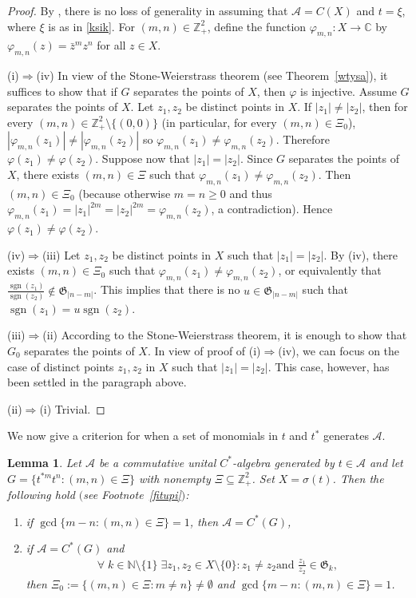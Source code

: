 \documentclass[reqno]{amsproc}
\DeclareMathOperator{\sgn}{sgn}
\numberwithin{equation}{section}
\newtheorem{lemma}[theorem]{Lemma}
\theoremstyle{remark}
\newcommand*{\ascr}{\mathscr{A}}
\newcommand*{\natu}{\mathbb{N}}
\newcommand*{\comp}{\mathbb{C}}
\newcommand*{\cbb}{\comp}
\theoremstyle{definition}
\newcommand*{\Ge}{\geqslant}
\newcommand*{\zbb}{\mathbb{Z}}
\begin{document}
   \begin{proof}
By \cite[Theorem~11.19]{Rud73}, there is no loss of
generality in assuming that $\ascr=C(X)$ and $t=\xi$,
where $\xi$ is as in \eqref{ksik}. For $(m,n)\in
\zbb_+^2$, define the function $\varphi_{m,n}\colon X
\to \cbb$ by $\varphi_{m,n}(z)=\bar z^{m} z^n$ for all
$z \in X$.

(i)$\Rightarrow$(iv) In view of the Stone-Weierstrass
theorem (see Theorem~\ref{wtysa}), it suffices to show
that if $G$ separates the points of $X$, then
$\varphi$ is injective. Assume $G$ separates the
points of $X$. Let $z_1, z_2$ be distinct points in
$X$. If $|z_1| \neq |z_2|$, then for every $(m,n)\in
\zbb_+^2 \setminus \{(0,0)\}$ (in particular, for
every $(m,n)\in \varXi_0$), $|\varphi_{m,n}(z_1)| \neq
|\varphi_{m,n}(z_2)|$ so $\varphi_{m,n}(z_1) \neq
\varphi_{m,n}(z_2)$. Therefore $\varphi(z_1) \neq
\varphi(z_2)$. Suppose now that $|z_1| = |z_2|$. Since
$G$ separates the points of $X$, there exists
$(m,n)\in \varXi$ such that $\varphi_{m,n}(z_1) \neq
\varphi_{m,n}(z_2)$. Then $(m,n)\in \varXi_0$ (because
otherwise $m=n \Ge 0$ and thus $\varphi_{m,n}(z_1) =
|z_1|^{2m} = |z_2|^{2m} = \varphi_{m,n}(z_2)$, a
contradiction). Hence $\varphi(z_1) \neq
\varphi(z_2)$.

(iv)$\Rightarrow$(iii) Let $z_1,z_2$ be distinct
points in $X$ such that $|z_1|=|z_2|$. By (iv), there
exists $(m,n)\in \varXi_0$ such that
$\varphi_{m,n}(z_1) \neq \varphi_{m,n}(z_2)$, or
equivalently that $\frac{\sgn(z_1)}{\sgn(z_2)} \notin
\mathfrak{G}_{|n-m|}$. This implies that there is no
$u\in \mathfrak{G}_{|n-m|}$ such that $\sgn(z_1) = u
\sgn(z_2)$.

(iii)$\Rightarrow$(ii) According to the
Stone-Weierstrass theorem, it is enough to show that
$G_0$ separates the points of $X$. In view of proof of
(i)$\Rightarrow$(iv), we can focus on the case of
distinct points $z_1, z_2$ in $X$ such that
$|z_1|=|z_2|$. This case, however, has been settled in
the paragraph above.

(ii)$\Rightarrow$(i) Trivial.
   \end{proof}
We now give a criterion for when a set of monomials in
$t$ and $t^*$ generates $\ascr$.
   \begin{lemma} \label{cxduns}
Let $\ascr$ be a commutative unital $C^*$-algebra
generated by $t\in \ascr$ and let $G=\{t^{*m}t^n\colon
(m,n)\in \varXi\}$ with nonempty $\varXi\subseteq
\zbb_+^2$. Set $X=\sigma(t)$. Then the following hold
$($see {\em Footnote~\ref{fitupi}}$)${\em :}
   \begin{enumerate}
   \item[(i)] if $\gcd\{m-n\colon (m,n)\in
\varXi\}=1$, then $\ascr=C^*(G)$,
   \item[(ii)] if $\ascr=C^*(G)$ and
   \begin{align} \label{fyrova}
\forall \; k\in \natu \setminus \{1\} \; \exists
z_1,z_2\in X\setminus \{0\} \colon z_1\neq z_2 \text{
and } \frac{z_1}{z_2} \in \mathfrak{G}_k,
   \end{align}
then $\varXi_0:=\{(m,n) \in \varXi\colon m\neq n\}
\neq \emptyset$ and $\gcd\{m-n\colon (m,n)\in
\varXi\}=1$.
   \end{enumerate}
   \end{lemma}
\end{document}
